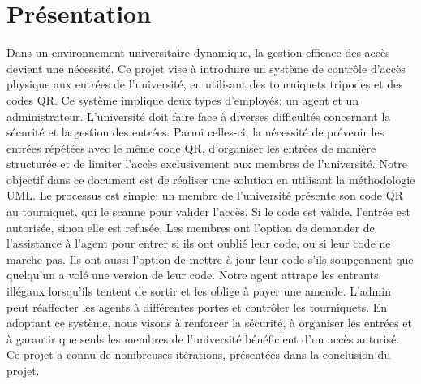 
\section{Présentation}
\raggedright\setlength{\parindent}{1em}
Dans un environnement universitaire dynamique, la gestion efficace des accès devient une nécessité. Ce projet vise à introduire un système de contrôle d'accès physique aux entrées de l'université, en utilisant des tourniquets tripodes et des codes QR. Ce système implique deux types d'employés: un agent et un administrateur. L'université doit faire face à diverses difficultés concernant la sécurité et la gestion des entrées. Parmi celles-ci, la nécessité de prévenir les entrées répétées avec le même code QR, d'organiser les entrées de manière structurée et de limiter l'accès exclusivement aux membres de l'université.
\newline
\newline
Notre objectif dans ce document est de réaliser une solution en utilisant la méthodologie UML. Le processus est simple: un membre de l'université présente son code QR au tourniquet, qui le scanne pour valider l'accès. Si le code est valide, l'entrée est autorisée, sinon elle est refusée. Les membres ont l'option de demander de l'assistance à l'agent pour entrer si ils ont oublié leur code, ou si leur code ne marche pas. Ils ont aussi l'option de mettre à jour leur code s'ils soupçonnent que quelqu'un a volé une version de leur code.
Notre agent attrape les entrants illégaux lorsqu'ils tentent de sortir et les oblige à payer une amende. L'admin peut réaffecter les agents à différentes portes et contrôler les tourniquets.
\newline
\newline
En adoptant ce système, nous visons à renforcer la sécurité, à organiser les entrées et à garantir que seuls les membres de l'université bénéficient d'un accès autorisé.
\newline
\newline
Ce projet a connu de nombreuses itérations, présentées dans la conclusion du projet.